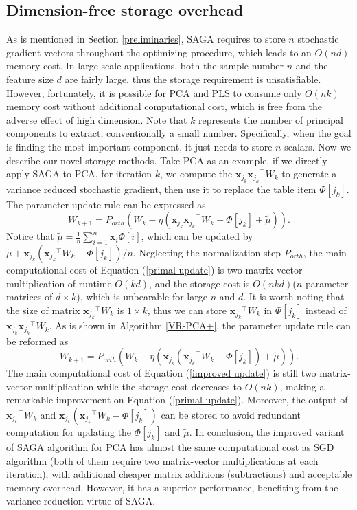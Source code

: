 \documentclass[runningheads,a4paper]{llncs}
\begin{document}
 \subsection{Dimension-free storage overhead}
 As is mentioned in Section \ref{preliminaries}, SAGA requires to store $n$ stochastic gradient vectors throughout the optimizing procedure, which leads to an $O(nd)$ memory cost. In large-scale applications, both the  sample number $n$ and the feature size $d$ are fairly large, thus the storage requirement is unsatisfiable. However, fortunately, it is possible for PCA and PLS to consume only $O(nk)$ memory cost without additional computational cost, which is free from the adverse effect of high dimension. Note that $k$ represents the number of principal components to extract, conventionally a small number. Specifically, when the goal is finding the most important component, it just needs to store $n$ scalars.
 Now we describe our novel storage methods. 
 Take PCA as an example, if we directly apply SAGA to PCA, for iteration $k$, we compute the $\mathbf{x}_{j_k}{\mathbf{x}_{j_k}}^{\top}W_k$ to generate a variance reduced stochastic gradient, then use it to replace the table item $\Phi[{j_k}]$. The parameter update rule can be expressed as
 \begin{equation}
 \label{primal update}
 W_{k+1} = P_{orth}(W_k - \eta(\mathbf{x}_{j_k}{\mathbf{x}_{j_k}}^{\top}W_k - \Phi[{j_k}] + \tilde{\mu})).
 \end{equation}
 Notice that $\tilde{\mu} = \frac{1}{n}\sum\limits_{i=1}^{n}\mathbf{x}_i\Phi[i]$, which can be updated by $ \tilde{\mu} + \mathbf{x}_{j_k}({\mathbf{x}_{j_k}}^{\top}W_k - \Phi[{j_k}])/n$. Neglecting the normalization step $P_{orth}$, the main computational cost of Equation (\ref{primal update}) is two matrix-vector multiplication of runtime $O(kd)$, and the storage cost is $O(nkd)$($n$ parameter matrices of $d \times k$), which is unbearable for large $n$ and $d$. 
It is worth noting that the size of matrix ${\mathbf{x}_{j_k}}^{\top}W_k$ is $1 \times k$, thus we can store ${\mathbf{x}_{j_k}}^{\top}W_k$ in $\Phi[{j_k}]$ instead of $\mathbf{x}_{j_k}{\mathbf{x}_{j_k}}^{\top}W_k$. As is shown in Algorithm \ref{VR-PCA+}, the parameter update rule can be reformed as 
 \begin{equation}
 \label{improved update}
 W_{k+1} = P_{orth}(W_k - \eta(\mathbf{x}_{j_k}({\mathbf{x}_{j_k}}^{\top}W_k - \Phi[j_k]) + \tilde{\mu})).
 \end{equation}
 The main computational cost of Equation (\ref{improved update}) is still two matrix-vector multiplication while the storage cost decreases to $O(nk)$, making a remarkable improvement on Equation (\ref{primal update}). Moreover, the output of ${\mathbf{x}_{j_k}}^{\top}W_k$ and $\mathbf{x}_{j_k}({\mathbf{x}_{j_k}}^{\top}W_k - \Phi[j_k])$ can be stored to avoid redundant computation for updating the $\Phi[j_k]$ and $\tilde{\mu}$. In conclusion, the improved variant of SAGA algorithm for PCA has almost the same computational cost as SGD algorithm (both of them require two matrix-vector multiplications at each iteration), with additional cheaper matrix additions (subtractions) and acceptable memory overhead. However, it has a superior performance, benefiting from the variance reduction virtue of SAGA.
\end{document}
